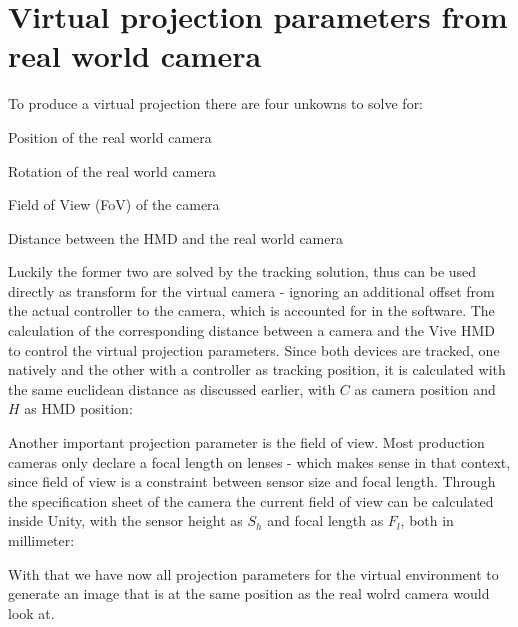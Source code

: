 \section{Virtual projection parameters from real world camera}

To produce a virtual projection there are four unkowns to solve for:

\begin{my_list}
	\item Position of the real world camera
	\item Rotation of the real world camera
	\item Field of View (FoV) of the camera
	\item Distance between the HMD and the real world camera
\end{my_list}

Luckily the former two are solved by the tracking solution, thus can be used 
directly as transform for the virtual camera - ignoring an  additional offset 
from the actual controller to the camera, which is accounted for in the 
software.
\newline
The calculation of the corresponding distance between a 
camera and the Vive HMD to control the virtual projection parameters. Since 
both devices are tracked, one natively and the other with a controller as 
tracking position, it is calculated with the same euclidean distance as 
discussed earlier, with $C$ as camera position and $H$ as HMD position:


Another important projection parameter is the field of view. Most production 
cameras only declare a focal length on lenses - which makes sense in that 
context, since field of view is a constraint between sensor size and focal 
length. Through the specification sheet of the camera the current field of view 
can be calculated inside Unity, with the sensor height as $S_h$ and focal 
length as $F_l$, both in millimeter:


With that we have now all projection parameters for the virtual environment to 
generate an image that is at the same position as the real wolrd camera would 
look at.